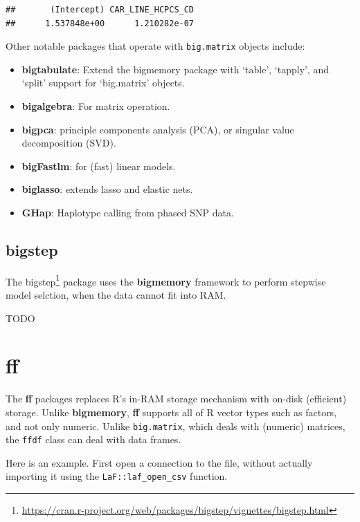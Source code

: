 \documentclass[]{book}
\providecommand{\tightlist}{%
  \setlength{\itemsep}{0pt}\setlength{\parskip}{0pt}}
\renewcommand{\href}[2]{#2\footnote{\url{#1}}}
\theoremstyle{definition}
\theoremstyle{definition}
\theoremstyle{definition}
\theoremstyle{remark}
\begin{document}
\begin{verbatim}
##       (Intercept) CAR_LINE_HCPCS_CD 
##      1.537848e+00      1.210282e-07
\end{verbatim}

Other notable packages that operate with \texttt{big.matrix} objects include:

\begin{itemize}
\tightlist
\item
  \textbf{bigtabulate}: Extend the bigmemory package with `table', `tapply', and `split' support for `big.matrix' objects.
\item
  \textbf{bigalgebra}: For matrix operation.
\item
  \textbf{bigpca}: principle components analysis (PCA), or singular value decomposition (SVD).
\item
  \textbf{bigFastlm}: for (fast) linear models.
\item
  \textbf{biglasso}: extends lasso and elastic nets.
\item
  \textbf{GHap}: Haplotype calling from phased SNP data.
\end{itemize}

\hypertarget{bigstep}{%
\subsection{bigstep}\label{bigstep}}

The \href{https://cran.r-project.org/web/packages/bigstep/vignettes/bigstep.html}{bigstep} package uses the \textbf{bigmemory} framework to perform stepwise model selction, when the data cannot fit into RAM.

TODO

\hypertarget{ff}{%
\section{ff}\label{ff}}

The \textbf{ff} packages replaces R's in-RAM storage mechanism with on-disk (efficient) storage.
Unlike \textbf{bigmemory}, \textbf{ff} supports all of R vector types such as factors, and not only numeric.
Unlike \texttt{big.matrix}, which deals with (numeric) matrices, the \texttt{ffdf} class can deal with data frames.

Here is an example.
First open a connection to the file, without actually importing it using the \texttt{LaF::laf\_open\_csv} function.
\end{document}
